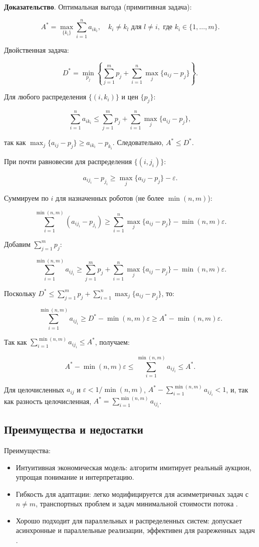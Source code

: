 \textbf{Доказательство}. Оптимальная выгода (примитивная задача):

\[
A^* = \max_{\{k_i\}} \sum_{i=1}^n a_{i k_i}, \quad k_i \neq k_l \text{ для } l \neq i, \text{ где } k_i \in \{1, \ldots, m\}.
\]

Двойственная задача:

\[
D^* = \min_{p_j} \left\{ \sum_{j=1}^m p_j + \sum_{i=1}^n \max_j \{a_{ij} - p_j\} \right\}.
\]

Для любого распределения \( \{ (i, k_i) \} \) и цен \( \{ p_j \} \):

\[
\sum_{i=1}^n a_{i k_i} \leq \sum_{j=1}^m p_j + \sum_{i=1}^n \max_j \{a_{ij} - p_j\},
\]

так как \( \max_j \{a_{ij} - p_j\} \geq a_{i k_i} - p_{k_i} \). Следовательно, \( A^* \leq D^* \).

При почти равновесии для распределения \( \{ (i, j_i) \} \):

\[
a_{i j_i} - p_{j_i} \geq \max_j \{a_{ij} - p_j\} - \varepsilon.
\]

Суммируем по \( i \) для назначенных роботов (не более \( \min(n, m) \)):

\[
\sum_{i=1}^{\min(n, m)} (a_{i j_i} - p_{j_i}) \geq \sum_{i=1}^n \max_j \{a_{ij} - p_j\} - \min(n, m) \varepsilon.
\]

Добавим \( \sum_{j=1}^m p_j \):

\[
\sum_{i=1}^{\min(n, m)} a_{i j_i} \geq \sum_{j=1}^m p_j + \sum_{i=1}^n \max_j \{a_{ij} - p_j\} - \min(n, m) \varepsilon.
\]

Поскольку \( D^* \leq \sum_{j=1}^m p_j + \sum_{i=1}^n \max_j \{a_{ij} - p_j\} \), то:

\[
\sum_{i=1}^{\min(n, m)} a_{i j_i} \geq D^* - \min(n, m) \varepsilon \geq A^* - \min(n, m) \varepsilon.
\]

Так как \( \sum_{i=1}^{\min(n, m)} a_{i j_i} \leq A^* \), получаем:

\[
A^* - \min(n, m) \varepsilon \leq \sum_{i=1}^{\min(n, m)} a_{i j_i} \leq A^*.
\]

Для целочисленных \( a_{ij} \) и \( \varepsilon < 1/\min(n, m) \), \( A^* - \sum_{i=1}^{\min(n, m)} a_{i j_i} < 1 \), и, так как разность целочисленная, \( A^* = \sum_{i=1}^{\min(n, m)} a_{i j_i} \).

\subsection{Преимущества и недостатки}
Преимущества:
\begin{itemize}
    \item Интуитивная экономическая модель: алгоритм имитирует реальный аукцион, упрощая понимание и интерпретацию.
    \item Гибкость для адаптации: легко модифицируется для асимметричных задач с \( n \neq m \), транспортных проблем и задач минимальной стоимости потока \cite{bertsekas1990}.
    \item Хорошо подходит для параллельных и распределенных систем: допускает асинхронные и параллельные реализации, эффективен для разреженных задач \cite{gerkey2003}.
\end{itemize}

